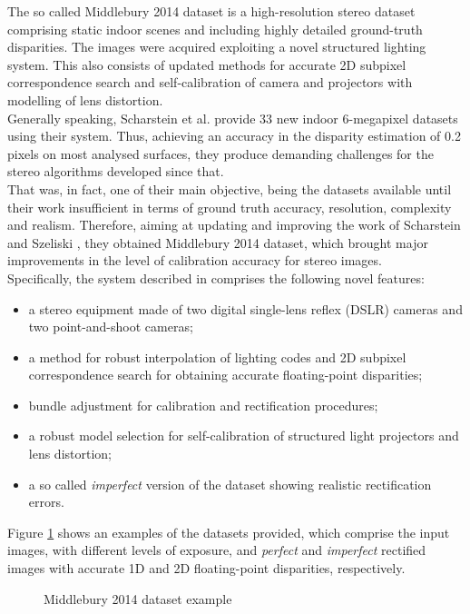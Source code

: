 The so called Middlebury 2014 dataset is a high-resolution stereo dataset comprising static indoor scenes and including highly detailed ground-truth disparities.
The images were acquired exploiting a novel structured lighting system.
This also consists of updated methods for accurate 2D subpixel correspondence search and self-calibration of camera and projectors with modelling of lens distortion.\\
Generally speaking, Scharstein et al. \cite{Scharstein2014} provide 33 new indoor 6-megapixel datasets using their system. 
Thus, achieving an accuracy in the disparity estimation of 0.2 pixels on most analysed surfaces, they produce demanding challenges for the stereo algorithms developed since that.\\
That was, in fact, one of their main objective, being the datasets available until their work insufficient in terms of ground truth accuracy, resolution, complexity and realism. 
Therefore, aiming at updating and improving the work of Scharstein and Szeliski \cite{scharstein2003high}, they obtained Middlebury 2014 dataset, which brought major improvements in the level of calibration accuracy for stereo images.\\
Specifically, the system described in \cite{Scharstein2014} comprises the following novel features: 
\begin{itemize}
	\item a stereo equipment made of two digital single-lens reflex (DSLR) cameras and two point-and-shoot cameras;
	\item a method for robust interpolation of lighting codes and 2D subpixel correspondence search for obtaining accurate floating-point disparities;
	\item bundle adjustment for calibration and rectification procedures;
	\item a robust model selection for self-calibration of structured light projectors and lens distortion;
	\item a so called \textit{imperfect} version of the dataset showing realistic rectification errors.
\end{itemize}  
Figure \ref{fig:dataset-example} shows an examples of the datasets provided, which comprise the input images, with different levels of exposure, and \textit{perfect} and \textit{imperfect} rectified images with accurate 1D and 2D floating-point disparities, respectively. 
 
\begin{figure}[t]
	\centering
\caption{Middlebury 2014 dataset example}
\label{fig:dataset-example}
\end{figure}

